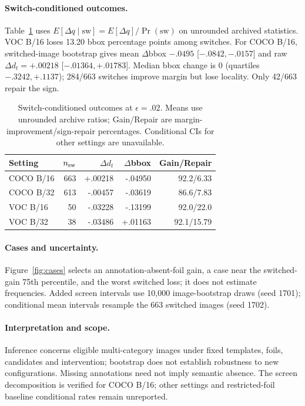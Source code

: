 \documentclass[10pt]{article}
\begin{document}
\paragraph{Switch-conditioned outcomes.}
Table~\ref{tab:repair_accounting} uses
$E[\Delta q\mid\mathrm{sw}]=E[\Delta q]/\Pr(\mathrm{sw})$ on unrounded
archived statistics. VOC B/16 loses 13.20 bbox percentage points among switches.
For COCO B/16, switched-image bootstrap gives mean $\Delta$bbox
$-.0495$ [$-.0842,-.0157$] and raw $\Delta d_t=+.00218$ [$-.01364,+.01783$].
Median bbox change is $0$ (quartiles $-.3242,+.1137$);
284/663 switches improve margin but lose locality. Only 42/663 repair the sign.

\begin{table}[!h]
\centering
\caption{Switch-conditioned outcomes at $\epsilon=.02$. Means use unrounded archive ratios; Gain/Repair are margin-improvement/sign-repair percentages. Conditional CIs for other settings are unavailable.}
\label{tab:repair_accounting}
\small
\setlength{\tabcolsep}{1.5pt}
\renewcommand{\arraystretch}{1.04}
\begin{tabular*}{\columnwidth}{@{\extracolsep{\fill}}lrrrr@{}}
\toprule
Setting & $n_{\rm sw}$ & $\Delta d_t$ & $\Delta$bbox & Gain/Repair\\
\midrule
COCO B/16 & 663 & +.00218 & -.04950 & 92.2/6.33\\
COCO B/32 & 613 & -.00457 & -.03619 & 86.6/7.83\\
VOC B/16 & 50 & -.03228 & -.13199 & 92.0/22.0\\
VOC B/32 & 38 & -.03486 & +.01163 & 92.1/15.79\\
\bottomrule
\end{tabular*}
\end{table}

\paragraph{Cases and uncertainty.}
Figure~\ref{fig:cases} selects an annotation-absent-foil gain, a case near the
switched-gain 75th percentile, and the worst switched loss; it does not estimate frequencies.
Added screen intervals use 10,000 image-bootstrap draws (seed 1701);
conditional mean intervals resample the 663 switched images (seed 1702).
\paragraph{Interpretation and scope.}
Inference concerns eligible multi-category images under fixed templates,
foils, candidates and intervention; bootstrap does not establish robustness
to new configurations. Missing annotations need not imply semantic absence.
The screen decomposition is verified for COCO B/16; other settings and
restricted-foil baseline conditional rates remain unreported.
\end{document}
